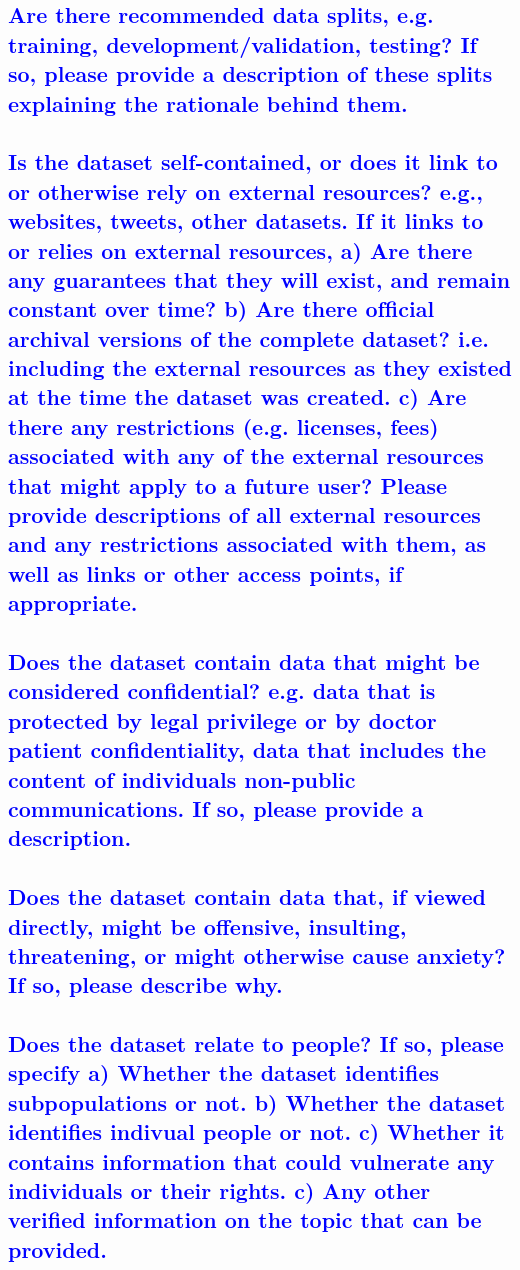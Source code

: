 \documentclass[letterpaper, 10 pt, conference]{ieeeconf}  %
\begin{document}
\textcolor{blue}{\subsection{Are there recommended data splits, e.g. training, development/validation, testing? If so, please provide a description of these splits explaining the rationale behind them.}}
\lipsum[1]

\textcolor{blue}{\subsection{Is the dataset self-contained, or does it link to or otherwise rely on external resources? e.g., websites, tweets, other datasets. If it links to or relies on external resources, a) Are there any guarantees that they will exist, and remain constant over time? b) Are there ofﬁcial archival versions of the complete dataset? i.e. including the external resources as they existed at the time the dataset was created. c) Are there any restrictions (e.g. licenses, fees) associated with any of the external resources that might apply to a future user? Please provide descriptions of all external resources and any restrictions associated with them, as well as links or other access points, if appropriate.}}
\lipsum[1]

\textcolor{blue}{\subsection{Does the dataset contain data that might be considered conﬁdential? e.g. data that is protected by legal privilege or by doctor patient conﬁdentiality, data that includes the content of individuals non-public communications. If so, please provide a description.}}
\lipsum[1]

\textcolor{blue}{\subsection{Does the dataset contain data that, if viewed directly, might be offensive, insulting, threatening, or might otherwise cause anxiety? If so, please describe why.}}
\lipsum[1]

\textcolor{blue}{\subsection{Does the dataset relate to people? If so, please specify a) Whether the dataset identifies subpopulations or not. b) Whether the dataset identifies indivual people or not. c) Whether it contains information that could vulnerate any individuals or their rights. c) Any other verified information on the topic that can be provided.}}
\lipsum[1]
\end{document}
